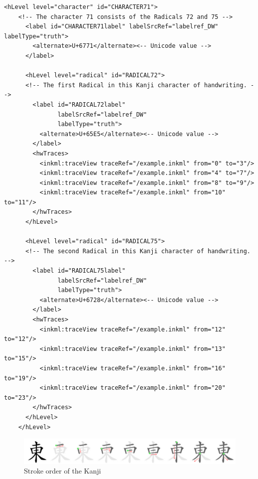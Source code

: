 \begin{xmlcode}
  \begin{lstlisting}[emph={hLevel,hwTraces,label,alternative},
                     emphstyle=\color{blue}\textbf,
                     emph={[2]id,level,labelSrcRef,labelType,traceRef,from,to},
                     emphstyle={[2]\color{red}},
                     caption={A character representation in UPX},
                     label=lst:charaterdataformat]
    <hLevel level="character" id="CHARACTER71">
    <!-- The character 71 consists of the Radicals 72 and 75 -->
      <label id="CHARACTER71label" labelSrcRef="labelref_DW" labelType="truth">
        <alternate>U+6771</alternate><-- Unicode value -->
      </label>

      <hLevel level="radical" id="RADICAL72">
      <!-- The first Radical in this Kanji character of handwriting. -->
        <label id="RADICAL72label" 
               labelSrcRef="labelref_DW" 
               labelType="truth">
          <alternate>U+65E5</alternate><-- Unicode value -->
        </label>
        <hwTraces>
          <inkml:traceView traceRef="/example.inkml" from="0" to="3"/>
          <inkml:traceView traceRef="/example.inkml" from="4" to="7"/>
          <inkml:traceView traceRef="/example.inkml" from="8" to="9"/>
          <inkml:traceView traceRef="/example.inkml" from="10" to="11"/>
        </hwTraces>
      </hLevel>

      <hLevel level="radical" id="RADICAL75">
      <!-- The second Radical in this Kanji character of handwriting. -->
        <label id="RADICAL75label" 
               labelSrcRef="labelref_DW" 
               labelType="truth">
          <alternate>U+6728</alternate><-- Unicode value -->
        </label>
        <hwTraces>
          <inkml:traceView traceRef="/example.inkml" from="12" to="12"/>
          <inkml:traceView traceRef="/example.inkml" from="13" to="15"/>
          <inkml:traceView traceRef="/example.inkml" from="16" to="19"/>
          <inkml:traceView traceRef="/example.inkml" from="20" to="23"/>
        </hwTraces>
      </hLevel>
    </hLevel>
  \end{lstlisting}
\end{xmlcode}

\begin{figure}[htbp]
  \begin{center}
    \includegraphics[scale=1.75]{images/radicalStructure/EAST-strokeorder.png}
    \caption{Stroke order of the Kanji }
    \label{fig:strokeorderofEAST}
  \end{center}
\end{figure}

